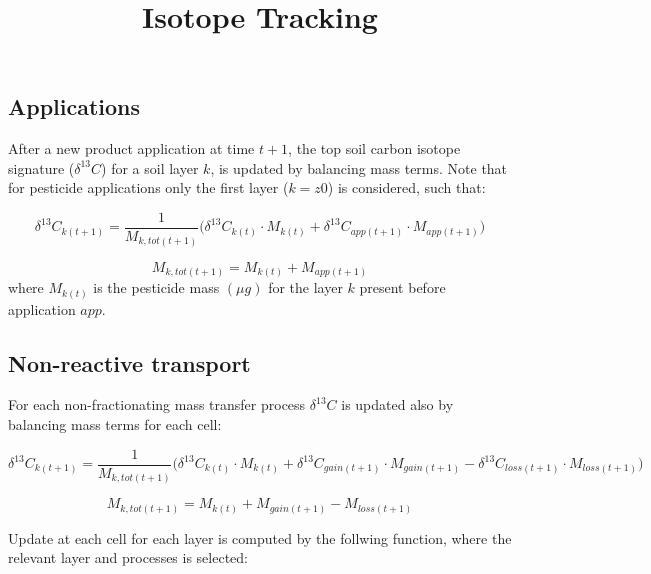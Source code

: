\documentclass[]{article}
\title{Isotope Tracking}
\author{}
\date{}
\begin{document}
\maketitle

\subsection{Applications}\label{applications}

After a new product application at time \(t+1\), the top soil carbon
isotope signature (\(\delta ^{13}C\)) for a soil layer \(k\), is updated
by balancing mass terms. Note that for pesticide applications only the
first layer (\(k=z0\)) is considered, such that:

\[
\delta ^{13}C_{k(t+1)} = \frac{1}{M_{k,tot(t+1)}} \Big(\delta ^{13}C_{k(t)} \cdot M_{k(t)} + \delta ^{13}C_{app(t+1)} \cdot M_{app(t+1)}  \Big)
\]

\[
M_{k,tot(t+1)} =  M_{k(t)} + M_{app(t+1)}
\] where \(M_{k(t)}\) is the pesticide mass \((\mu g)\) for the layer
\(k\) present before application \(app\).

\subsection{Non-reactive transport}\label{non-reactive-transport}

For each non-fractionating mass transfer process \(\delta ^{13}C\) is
updated also by balancing mass terms for each cell:

\[
\delta ^{13}C_{k(t+1)} = \frac{1}{M_{k,tot(t+1)}} \Big(\delta ^{13}C_{k(t)} \cdot M_{k(t)} + \delta ^{13}C_{gain(t+1)} \cdot M_{gain(t+1)} -  \delta ^{13}C_{loss(t+1)} \cdot M_{loss(t+1)}  \Big)
\]

\[
M_{k,tot(t+1)} =  M_{k(t)} + M_{gain(t+1)} -  M_{loss(t+1)}
\]

Update at each cell for each layer is computed by the follwing function,
where the relevant layer and processes is selected:
\end{document}
